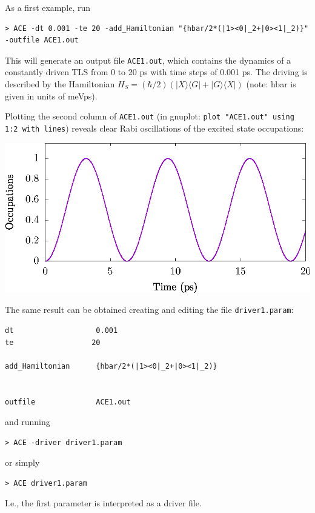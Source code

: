 \documentclass{scrartcl}
\begin{document}
As a first example, run
\begin{verbatim}
> ACE -dt 0.001 -te 20 -add_Hamiltonian "{hbar/2*(|1><0|_2+|0><1|_2)}" -outfile ACE1.out
\end{verbatim}
This will generate an output file \texttt{ACE1.out}, which contains the dynamics
of a constantly driven TLS from 0 to 20 ps with time steps of 0.001 ps.
The driving is described by the Hamiltonian 
$H_S=(\hbar/2)(|X\rangle\langle G|+|G\rangle\langle X|)$ (note: hbar is given
in units of meVps).

Plotting the second column of \texttt{ACE1.out} 
(in gnuplot: \verb+plot "ACE1.out" using 1:2 with lines+) reveals clear 
Rabi oscillations of the excited state occupations:

\includegraphics[width=20cm]{figs/example1.eps}

The same result can be obtained creating and editing the file 
\texttt{driver1.param}:


\noindent\makebox[5cm]{\rule{7cm}{0.4pt}}
\begin{verbatim}
dt                   0.001 
te                  20 

add_Hamiltonian      {hbar/2*(|1><0|_2+|0><1|_2)}


outfile              ACE1.out
\end{verbatim}
\noindent\makebox[5cm]{\rule{7cm}{0.4pt}}

and running
\begin{verbatim}
> ACE -driver driver1.param
\end{verbatim}
or simply 
\begin{verbatim}
> ACE driver1.param
\end{verbatim}
I.e., the first parameter is interpreted as a driver file.
\end{document}
